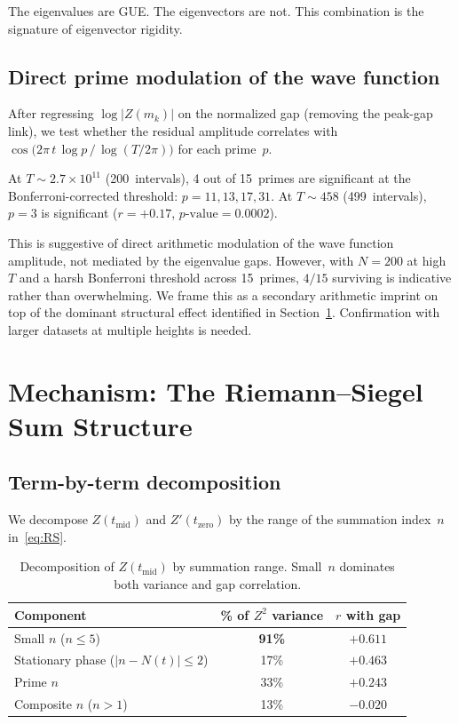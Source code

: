 \documentclass[11pt,a4paper]{article}
\begin{document}
The eigenvalues are GUE\@.
The eigenvectors are not.
This combination is the signature of eigenvector rigidity.

\subsection{Direct prime modulation of the wave function}

After regressing $\log|Z(m_k)|$ on the normalized gap (removing the peak-gap link), we test whether the residual amplitude correlates with $\cos\!\bigl(2\pi\, t\, \log p\,/\,\log(T/2\pi)\bigr)$ for each prime~$p$.

At $T \sim 2.7\times10^{11}$ (200~intervals), 4 out of 15~primes are significant at the Bonferroni-corrected threshold: $p = 11, 13, 17, 31$.
At $T \sim 458$ (499~intervals), $p = 3$ is significant ($r = +0.17$, $p\text{-value} = 0.0002$).

This is suggestive of direct arithmetic modulation of the wave function amplitude, not mediated by the eigenvalue gaps.
However, with $N = 200$ at high~$T$ and a harsh Bonferroni threshold across 15~primes, $4/15$ surviving is indicative rather than overwhelming.
We frame this as a secondary arithmetic imprint on top of the dominant structural effect identified in Section~\ref{sec:mechanism}.
Confirmation with larger datasets at multiple heights is needed.

\section{Mechanism: The Riemann--Siegel Sum Structure}\label{sec:mechanism}

\subsection{Term-by-term decomposition}

We decompose $Z(t_{\mathrm{mid}})$ and $Z'(t_{\mathrm{zero}})$ by the range of the summation index~$n$ in~\eqref{eq:RS}.

\begin{table}[ht]
\centering
\begin{tabular}{@{}lcc@{}}
\toprule
Component & \% of $Z^2$ variance & $r$ with gap \\
\midrule
Small $n$ ($n \le 5$)                & \textbf{91\%} & $\mathbf{+0.611}$ \\
Stationary phase ($|n - N(t)| \le 2$) & 17\%          & $+0.463$ \\
Prime $n$                            & 33\%          & $+0.243$ \\
Composite $n$ ($n > 1$)              & 13\%          & $-0.020$ \\
\bottomrule
\end{tabular}
\caption{Decomposition of $Z(t_{\mathrm{mid}})$ by summation range. Small~$n$ dominates both variance and gap correlation.}
\label{tab:Zdecomp}
\end{table}
\end{document}
